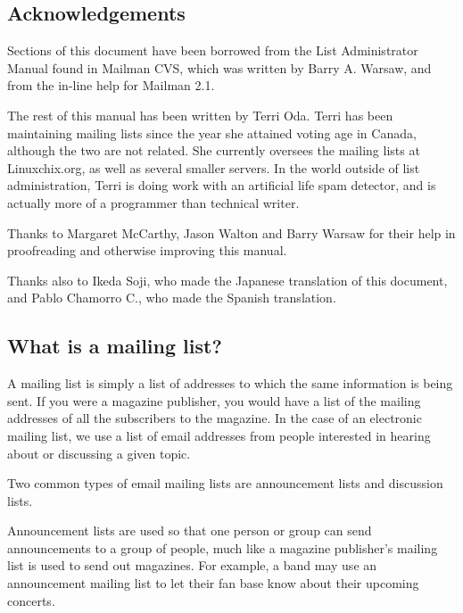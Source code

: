 \documentclass{howto}
\begin{document}
\subsection{Acknowledgements}

Sections of this document have been borrowed from the List Administrator Manual
found in Mailman CVS, which was written by Barry A. Warsaw, and from the in-line
help for Mailman 2.1.  

The rest of this manual has been written by Terri Oda.
Terri has been maintaining mailing lists since the year she attained 
voting age in Canada, although the two are not related.  She currently 
oversees the mailing lists at Linuxchix.org, as well as several smaller 
servers.  In the world outside of list administration, Terri is doing 
work with an artificial life spam detector, and is actually more of a 
programmer than technical writer.

Thanks to Margaret McCarthy, Jason Walton and Barry Warsaw for their help 
in proofreading and otherwise improving this manual.  

Thanks also to Ikeda Soji, who made the Japanese translation of this
document, and Pablo Chamorro C., who made the Spanish translation.


\subsection{What is a mailing list?}

A mailing list is simply a list of addresses to which the same information
is being sent.  If you were a magazine publisher, you would have a list of
the mailing addresses of all the subscribers to the magazine.  In the case
of an electronic mailing list, we use a list of email addresses from people
interested in hearing about or discussing a given topic.  

Two common types of email mailing lists are announcement lists and discussion 
lists.  

Announcement lists are used so that one person or group can send
announcements to a group of people, much like a magazine publisher's mailing
list is used to send out magazines.  For example, a band may use an
announcement mailing list to let their fan base know about their upcoming
concerts.
\end{document}
